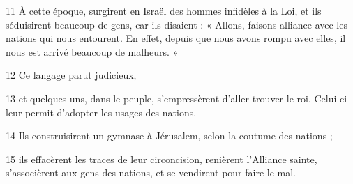 
11 À cette époque, surgirent en Israël des hommes infidèles à la Loi, et ils séduisirent beaucoup de gens, car ils disaient : « Allons, faisons alliance avec les nations qui nous entourent. En effet, depuis que nous avons rompu avec elles, il nous est arrivé beaucoup de malheurs. »

12 Ce langage parut judicieux,

13 et quelques-uns, dans le peuple, s’empressèrent d’aller trouver le roi. Celui-ci leur permit d’adopter les usages des nations.

14 Ils construisirent un gymnase à Jérusalem, selon la coutume des nations ;

15 ils effacèrent les traces de leur circoncision, renièrent l’Alliance sainte, s’associèrent aux gens des nations, et se vendirent pour faire le mal.